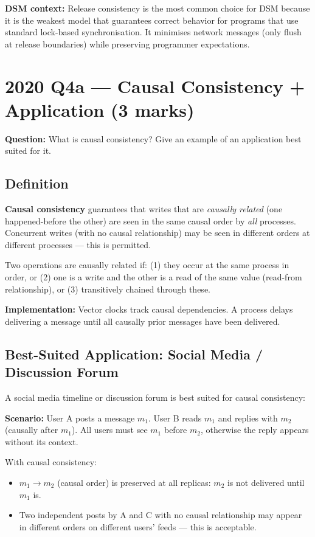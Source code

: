 \documentclass[12pt,a4paper]{article}
\begin{document}
\textbf{DSM context:} Release consistency is the most common choice for DSM because it is the weakest model that guarantees correct behavior for programs that use standard lock-based synchronisation. It minimises network messages (only flush at release boundaries) while preserving programmer expectations.

\section{2020 Q4a --- Causal Consistency + Application (3 marks)}

\textbf{Question:} What is causal consistency? Give an example of an application best suited for it.

\subsection*{Definition}

\textbf{Causal consistency} guarantees that writes that are \emph{causally related} (one happened-before the other) are seen in the same causal order by \emph{all} processes. Concurrent writes (with no causal relationship) may be seen in different orders at different processes --- this is permitted.

Two operations are causally related if: (1) they occur at the same process in order, or (2) one is a write and the other is a read of the same value (read-from relationship), or (3) transitively chained through these.

\textbf{Implementation:} Vector clocks track causal dependencies. A process delays delivering a message until all causally prior messages have been delivered.

\subsection*{Best-Suited Application: Social Media / Discussion Forum}

A social media timeline or discussion forum is best suited for causal consistency:

\textbf{Scenario:} User A posts a message $m_1$. User B reads $m_1$ and replies with $m_2$ (causally after $m_1$). All users must see $m_1$ before $m_2$, otherwise the reply appears without its context.

With causal consistency:
\begin{itemize}[noitemsep]
  \item $m_1 \to m_2$ (causal order) is preserved at all replicas: $m_2$ is not delivered until $m_1$ is.
  \item Two independent posts by A and C with no causal relationship may appear in different orders on different users' feeds --- this is acceptable.
\end{itemize}
\end{document}

